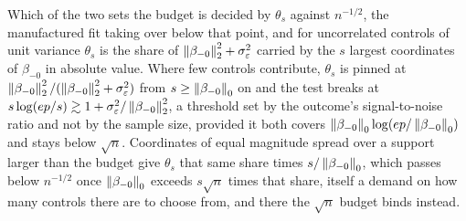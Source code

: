 Which of the two sets the budget is decided by $\theta_s$ against
$n^{-1/2}$, the manufactured fit taking over below that point, and for
uncorrelated controls of unit variance $\theta_s$ is the share of
$\left\lVert \beta_{-0} \right\rVert_2^2 + \sigma_\varepsilon^2$ carried by the $s$ largest
coordinates of $\beta_{-0}$ in absolute value. Where few controls contribute,
$\theta_s$ is pinned at $\left\lVert \beta_{-0} \right\rVert_2^2
/ (\left\lVert \beta_{-0} \right\rVert_2^2 + \sigma_\varepsilon^2)$ from
$s \ge \left\lVert \beta_{-0} \right\rVert_0$ on and the test breaks at
$s\log(ep/s) \gtrsim 1 + \sigma_\varepsilon^2 / \left\lVert \beta_{-0} \right\rVert_2^2$, a
threshold set by the outcome's signal-to-noise ratio and not by the
sample size, provided it both covers
$\left\lVert \beta_{-0} \right\rVert_0 \log(ep/\left\lVert \beta_{-0} \right\rVert_0)$ and stays below
$\sqrt n$.
Coordinates of equal magnitude spread over a support larger than the
budget give $\theta_s$ that same share times $s / \left\lVert \beta_{-0} \right\rVert_0$,
which passes below $n^{-1/2}$ once $\left\lVert \beta_{-0} \right\rVert_0$ exceeds
$s \sqrt n$ times that share, itself a demand on how many controls there
are to choose from, and there the $\sqrt n$ budget binds instead.

